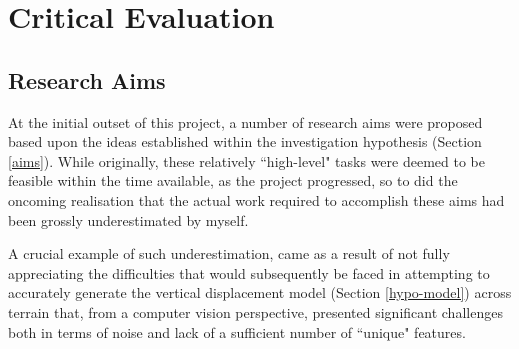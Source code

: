 \chapter{Critical Evaluation}
%
%
%
%
%


\section{Research Aims}

At the initial outset of this project, a number of research aims were proposed based upon the ideas established within the investigation hypothesis (Section \ref{aims}). While originally, these relatively ``high-level" tasks were deemed to be feasible within the time available, as the project progressed, so to did the oncoming realisation that the actual work required to accomplish these aims had been grossly underestimated by myself. 

A crucial example of such underestimation, came as a result of not fully appreciating the difficulties that would subsequently be faced in attempting to accurately generate the vertical displacement model (Section \ref{hypo-model}) across terrain that, from a computer vision perspective, presented significant challenges both in terms of noise and lack of a sufficient number of ``unique" features.

